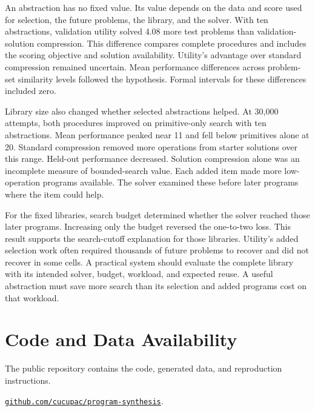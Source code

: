 \documentclass[10pt]{article}
\begin{document}
An abstraction has no fixed value. Its value depends on the data and score used
for selection, the future problems, the library, and the solver. With ten
abstractions, validation utility solved 4.08 more test problems than
validation-solution compression. This difference compares complete procedures
and includes the scoring objective and solution availability. Utility's
advantage over standard compression remained uncertain. Mean performance
differences across problem-set similarity levels followed the hypothesis.
Formal intervals for these differences included zero.

Library size also changed whether selected abstractions helped. At 30,000
attempts, both procedures improved on primitive-only search with ten
abstractions. Mean performance peaked near 11 and fell below primitives alone at
20. Standard compression removed more operations from starter solutions over
this range. Held-out performance decreased. Solution compression alone was an
incomplete measure of bounded-search value. Each added item made more
low-operation programs available. The solver examined these before later
programs where the item could help.

For the fixed libraries, search budget determined whether the solver reached
those later programs. Increasing only the budget reversed the one-to-two loss.
This result supports the search-cutoff explanation for those libraries.
Utility's added selection work often required thousands of future problems to
recover and did not recover in some cells. A practical system should evaluate
the complete library with its intended solver, budget, workload, and expected
reuse. A useful abstraction must save more search than its selection and added
programs cost on that workload.

\section*{Code and Data Availability}

The public repository contains the code, generated data, and reproduction
instructions.
\par\smallskip
\noindent
\href{https://github.com/cucupac/program-synthesis}{%
\mbox{\texttt{github.com/cucupac/program-synthesis}}}.



\end{document}
